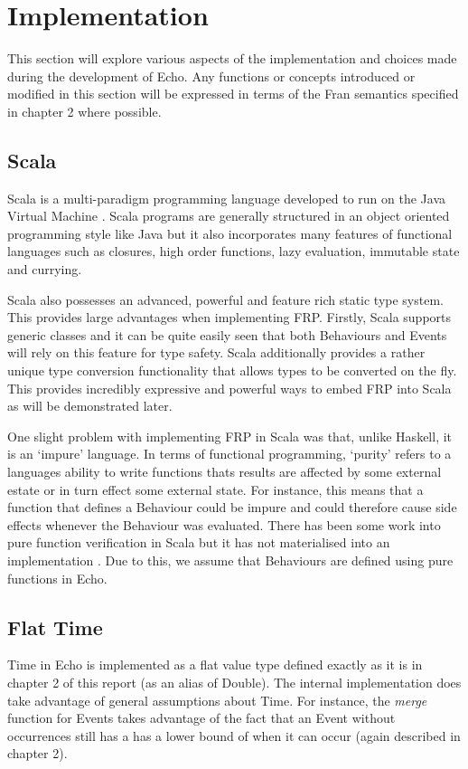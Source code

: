 \chapter{Implementation}
  This section will explore various aspects of the implementation and choices made during the development
  of Echo. Any functions or concepts introduced or modified in this section will be expressed in terms
  of the Fran semantics specified in chapter 2 where possible.
  
  \section{Scala}
    Scala is a multi-paradigm programming language developed to run on the Java Virtual Machine \cite{Odersky2004}. Scala 
    programs are
    generally structured in an object oriented programming style like Java but it also incorporates many features of
    functional languages such as closures, high order functions, lazy evaluation, immutable state and currying.

    Scala also possesses an advanced, powerful and feature rich static type system. This provides large
    advantages when implementing FRP. Firstly, Scala supports generic classes and it can be quite easily seen
    that both Behaviours and Events will rely on this feature for type safety. Scala additionally provides
    a rather unique type conversion functionality that allows types to be converted on the fly. This provides
    incredibly expressive and powerful ways to embed FRP into Scala as will be demonstrated later.
    
    One slight problem with implementing FRP in Scala was that, unlike Haskell, it is an `impure'
    language. In terms of functional programming, `purity' refers to a languages ability to write functions
    thats results are affected by some external estate or in turn effect some external state. For instance,
    this means that a function that defines a Behaviour could be impure and could therefore cause side effects
    whenever the Behaviour was evaluated. There has been some work into pure function verification in Scala but it has not materialised into an  
    implementation \cite{Nordenberg}. Due to this, we assume that Behaviours are defined using pure functions in Echo.

  \section{Flat Time}
    Time in Echo is implemented as a flat value type defined exactly as it is in 
    chapter 2 of this report (as an alias of Double). The internal implementation does take advantage
    of general assumptions about Time. For instance, the \emph{merge} function for Events takes advantage
    of the fact that an Event without occurrences still has a has a lower bound of when it can occur (again described
    in chapter 2). 
    
